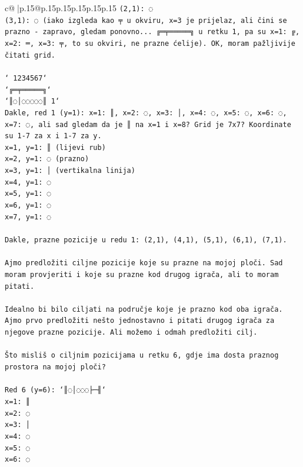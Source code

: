 \documentclass{article}
\begin{document}
{\begin{supertabular}{c@{$\;$}|p{.15\linewidth}@{}p{.15\linewidth}p{.15\linewidth}p{.15\linewidth}p{.15\linewidth}p{.15\linewidth}}
{{{\texttt{(2,1): ◌} \\
\texttt{(3,1): ◌ (iako izgleda kao ╤ u okviru, x=3 je prijelaz, ali čini se prazno {-} zapravo, gledam ponovno... ╔═╤═════╗ u retku 1, pa su x=1: ╔, x=2: ═, x=3: ╤, to su okviri, ne prazne ćelije). OK, moram pažljivije čitati grid.} \\
\\ 
\texttt{` 1234567`} \\
\texttt{`╔═╤═════╗`} \\
\texttt{`║◌│◌◌◌◌◌║ 1`} \\
\texttt{Dakle, red 1 (y=1): x=1: ║, x=2: ◌, x=3: │, x=4: ◌, x=5: ◌, x=6: ◌, x=7: ◌, ali sad gledam da je ║ na x=1 i x=8? Grid je 7x7? Koordinate su 1{-}7 za x i 1{-}7 za y. } \\
\texttt{x=1, y=1: ║ (lijevi rub)} \\
\texttt{x=2, y=1: ◌ (prazno)} \\
\texttt{x=3, y=1: │ (vertikalna linija)} \\
\texttt{x=4, y=1: ◌} \\
\texttt{x=5, y=1: ◌} \\
\texttt{x=6, y=1: ◌} \\
\texttt{x=7, y=1: ◌} \\
\\ 
\texttt{Dakle, prazne pozicije u redu 1: (2,1), (4,1), (5,1), (6,1), (7,1).} \\
\\ 
\texttt{Ajmo predložiti ciljne pozicije koje su prazne na mojoj ploči. Sad moram provjeriti i koje su prazne kod drugog igrača, ali to moram pitati.} \\
\\ 
\texttt{Idealno bi bilo ciljati na područje koje je prazno kod oba igrača. Ajmo prvo predložiti nešto jednostavno i pitati drugog igrača za njegove prazne pozicije. Ali možemo i odmah predložiti cilj.} \\
\\ 
\texttt{Što misliš o ciljnim pozicijama u retku 6, gdje ima dosta praznog prostora na mojoj ploči?} \\
\\ 
\texttt{Red 6 (y=6): `║◌│◌◌◌├─╢`} \\
\texttt{x=1: ║} \\
\texttt{x=2: ◌} \\
\texttt{x=3: │} \\
\texttt{x=4: ◌} \\
\texttt{x=5: ◌} \\
\texttt{x=6: ◌} \\
}}}
\end{supertabular}}
\end{document}
